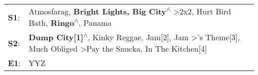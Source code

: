 \begin{supertabular}{p{0.03\textwidth}p{0.92\textwidth}}
 \textbf{S1}:  &                                                                                   Atmosfarag\textsuperscript{}, \enspace \textbf{Bright Lights, Big City\textsuperscript{$\wedge$}} \textgreater \enspace 2x2\textsuperscript{}, \enspace Hurt Bird Bath\textsuperscript{}, \enspace \textbf{Ringo\textsuperscript{$\wedge$}}, \enspace Panama\textsuperscript{}  \enspace  \\
 \textbf{S2}:  &  \textbf{Dump City[1]\textsuperscript{$\wedge$}}, \enspace Kinky Reggae\textsuperscript{}, \enspace Jam[2]\textsuperscript{}, \enspace Jam\textsuperscript{} \textgreater {}'s Theme[3]\textsuperscript{}, \enspace Much Obliged\textsuperscript{} \textgreater \enspace Pay the Snucka\textsuperscript{}, \enspace In The Kitchen[4]\textsuperscript{}  \enspace  \\
 \textbf{E1}:  &                                                                                                                                                                                                                                                                                                                                            YYZ\textsuperscript{}  \enspace  \\
\end{supertabular}
